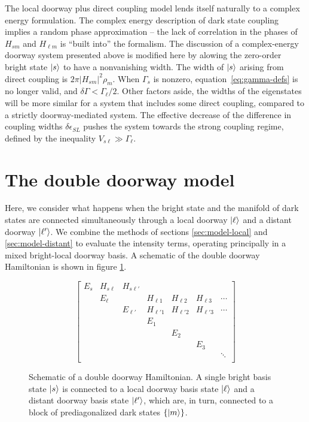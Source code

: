 \documentclass[12pt]{mitthesis}
\begin{document}
The local doorway plus direct coupling model lends itself naturally to
a complex energy formulation.  The complex energy description of dark
state coupling implies a random phase approximation -- the lack of
correlation in the phases of $H_{sm}$ and $H_{\ell m}$ is ``built
into'' the formalism.  The discussion of a complex-energy doorway
system presented above is modified here by alowing the zero-order
bright state $\mathinner{|{s}\rangle}$ to have a nonvanishing width.  The width of
$\mathinner{|{s}\rangle}$ arising from direct coupling is $2 \pi \lvert H_{sm}
\rvert^2 \rho_m$.  When $\Gamma_s$ is nonzero,
equation~\ref{eq:gamma-defs} is no longer valid, and $\delta \Gamma <
\Gamma_\ell / 2$.  Other factors aside, the widths of the eigenstates
will be more similar for a system that includes some direct coupling,
compared to a strictly doorway-mediated system.  The effective
decrease of the difference in coupling widths $\delta \epsilon_{SL}$
pushes the system towards the strong coupling regime, defined by the
inequality $V_{s\ell} \gg \Gamma_\ell$.


\section{The double doorway model}
\label{sec:model-double}

Here, we consider what happens when the bright state and the manifold
of dark states are connected simultaneously through a local doorway
$\mathinner{|{\ell}\rangle}$ and a distant doorway $\mathinner{|{\ell'}\rangle}$. We combine the
methods of sections \ref{sec:model-local} and \ref{sec:model-distant}
to evaluate the intensity terms, operating principally in a mixed
bright-local doorway basis.  A schematic of the double doorway
Hamiltonian is shown in figure \ref{fig:matrix-double}.

\begin{figure}
  \caption{Schematic of a double doorway Hamiltonian. A single bright
    basis state $\mathinner{|{s}\rangle}$ is connected to a local doorway basis state
    $\mathinner{|{\ell}\rangle}$ and a distant doorway basis state $\mathinner{|{\ell'}\rangle}$, which
    are, in turn, connected to a block of prediagonalized dark states
    $\lbrace \mathinner{|{m}\rangle} \rbrace$.}
  \label{fig:matrix-double}
  \begin{equation*}
    \begin{bmatrix}
    E_s & H_{s \ell} & H_{s\ell'} \\
    & E_\ell & & H_{\ell 1} & H_{\ell 2} & H_{\ell 3} & \dotsm \\
    & & E_{\ell'} & H_{\ell' 1} & H_{\ell' 2} & H_{\ell' 3} & \dotsm \\
    & & & E_1 \\
    & & & & E_2 \\
    & & & & & E_3 \\
    & & & & & & \ddots \\
    \end{bmatrix}
  \end{equation*}
\end{figure}
\end{document}
